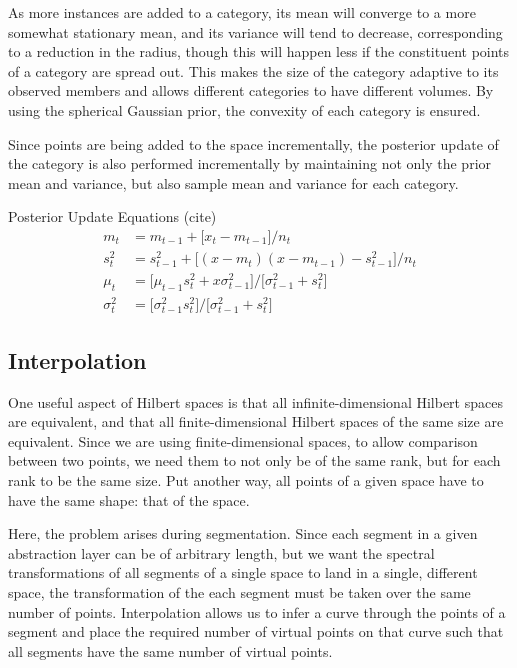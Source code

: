 \documentclass[runningheads]{llncs}
\begin{document}
As more instances are added to a category, its mean will converge to a more somewhat stationary mean, and its variance will tend to decrease, corresponding to a reduction in the radius, though this will happen less if the constituent points of a category are spread out.  This makes the size of the category adaptive to its observed members and allows different categories to have different volumes.  By using the spherical Gaussian prior, the convexity of each category is ensured.

Since points are being added to the space incrementally, the posterior update of the category is also performed incrementally by maintaining not only the prior mean and variance, but also sample mean and variance for each category.

Posterior Update Equations (cite)
  \begin{align}
    m_t &= m_{t-1} + \big[ x_t - m_{t-1} \big] / n_t 
      \tag*{(Sample Mean)} \\
    s_t^2 &= s_{t-1}^2 + \big[ (x - m_t)(x - m_{t-1}) - s_{t-1}^2 \big] / n_t
      \tag*{(Sample Variance)} \\
    \mu_t &= \big[ \mu_{t-1} s_t^2 + x \sigma_{t-1}^2 \big] / \big[ \sigma_{t-1}^2 + s_t^2 \big]
      \tag*{(Posterior Mean)} \\
    \sigma_t^2 &= \big[ \sigma_{t-1}^2 s_t^2 \big] / \big[ \sigma_{t-1}^2 + s_t^2 \big]
      \tag*{(Posterior Variance)}
  \end{align}



\subsection{Interpolation}

One useful aspect of Hilbert spaces is that all infinite-dimensional Hilbert spaces are equivalent, and that all finite-dimensional Hilbert spaces of the same size are equivalent.  Since we are using finite-dimensional spaces, to allow comparison between two points, we need them to not only be of the same rank, but for each rank to be the same size.  Put another way, all points of a given space have to have the same shape: that of the space.

Here, the problem arises during segmentation.  Since each segment in a given abstraction layer can be of arbitrary length, but we want the spectral transformations of all segments of a single space to land in a single, different space, the transformation of the each segment must be taken over the same number of points.  Interpolation allows us to infer a curve through the points of a segment and place the required number of virtual points on that curve such that all segments have the same number of virtual points.
\end{document}
